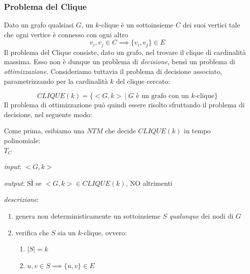 \subsubsection{Problema del Clique}
Dato un grafo qualsiasi $G$, un $k$-clique è un sottoinsieme $C$ dei suoi vertici tale che ogni vertice è connesso con ogni altro
\[
	v_i, v_j \in C \implies \{v_i, v_j\} \in E
\]
Il problema del Clique consiste, dato un grafo, nel trovare il clique di cardinalità massima. Esso non è dunque un problema di \textit{decisione}, bensì un problema di \textit{ottimizzazione}. Consideriamo tuttavia il problema di decisione associato, parametrizzando per la cardinalità $k$ del clique cercato:

\[
	CLIQUE(k) = \{ <G, k> \ | \ G \text{ è un grafo con un } k\text{-clique} \}
\]
Il problema di ottimizzazione può quindi essere risolto sfruttando il problema di decisione, nel seguente modo:
\IncMargin{1em}
\begin{algorithm}

\BlankLine
{}
\end{algorithm}\DecMargin{1em}

\newpage

Come prima, esibiamo una $NTM$ che decide $CLIQUE(k)$ in tempo \\
polinomiale:
\\

$T_{C}$
\begin{description}
	\item \textit{input}: $<G, k>$
	\item \textit{output}: SÌ se $<G, k> \in CLIQUE(k)$, NO altrimenti
	\item \textit{descrizione}:
	\begin{enumerate}[label*=\arabic*.]
		\item genera non deterministicamente un sottoinsieme $S$ \textit{qualunque} dei nodi di $G$

		\item verifica che $S$ sia un $k$-clique, ovvero:
		\begin{enumerate}[label*=\arabic*.]
			\item $|S| = k$
			\item $u, v \in S \implies \{u, v\} \in E$
		\end{enumerate}
	\end{enumerate}
\end{description}

